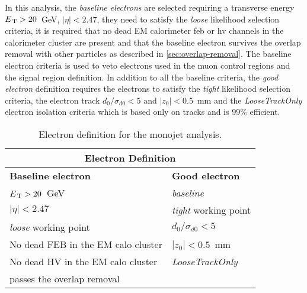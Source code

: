 In this analysis, the \emph{baseline electrons} are selected requiring a
transverse energy $E_\mathrm{\, T} > 20$~GeV, $|\eta| < 2.47$, they need to satisfy the
\emph{loose} likelihood selection criteria, it is required that no dead EM
calorimeter \gls{feb} or \gls{hv} channels in the calorimeter cluster are
present and that the baseline electron survives the overlap removal with other
particles as described in \cref{sec:overlap-removal}. The baseline electron
criteria is used to veto electrons used in the muon control regions and the
signal region definition. In addition to all the baseline criteria, the
\emph{good electron} definition requires the electrons to satisfy the
\emph{tight} likelihood selection criteria, the electron track
$d_0 / \sigma_{d0} < 5$ and $|z_0| < 0.5$~mm and the \emph{LooseTrackOnly}
electron isolation criteria which is based only on tracks and is 99\% efficient.
\begin{table}[!th]
  \centering
  \begin{tabular}{ll}
    \toprule
    \multicolumn{2}{c}{Electron Definition} \\
    \midrule \midrule
    \textbf{Baseline electron} & \textbf{Good electron} \\
    \midrule
    $E_\mathrm{\, T} > 20$~GeV & \emph{baseline} \\
    $|\eta| < 2.47$ & \emph{tight} working point \\
    \emph{loose} working point & $d_0 / \sigma_{d0} < 5$ \\
    No dead FEB in the EM calo cluster & $|z_0| < 0.5$~mm \\
    No dead HV in the EM calo cluster & \emph{LooseTrackOnly} \\
    passes the overlap removal & \\
    \bottomrule
  \end{tabular}
  \caption{Electron definition for the monojet analysis.}
  \label{tab:ele_def}
\end{table}
